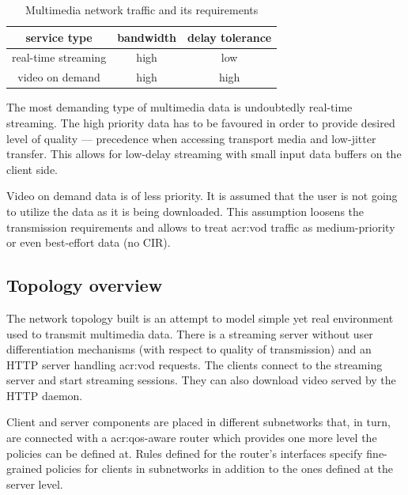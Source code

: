 \documentclass[11pt]{book}
\begin{document}
        \begin{table}[H]
          \begin{center}
            \begin{tabular}{|c|c|c|}
              \hline
              service type        & bandwidth & delay tolerance \\
              \hline \hline
              real-time streaming & high      & low \\
              \hline
              video on demand     & high      & high  \\
              \hline
            \end{tabular}
          \end{center}


          \caption{Multimedia network traffic and its requirements}
          \label{tab:uc:qos}
        \end{table}

        The most demanding type of multimedia data is undoubtedly real-time streaming. The high priority data has to be
        favoured in order to provide desired level of quality --- precedence when accessing transport media and
        low-jitter transfer. This allows for low-delay streaming with small input data buffers on the client side.

        Video on demand data is of less priority. It is assumed that the user is not going to utilize the data as it is
        being downloaded. This assumption loosens the transmission requirements and allows to treat \gls{acr:vod} traffic as
        medium-priority or even best-effort data (no CIR).


      \subsection{Topology overview}

        The network topology built is an attempt to model simple yet real environment used to transmit multimedia data.
        There is a streaming server without user differentiation mechanisms (with respect to quality of transmission)
        and an HTTP server handling \gls{acr:vod} requests. The clients connect to the streaming server and start streaming
        sessions. They can also download video served by the HTTP daemon.

        Client and server components are placed in different subnetworks that, in turn, are connected with a \gls{acr:qos}-aware
        router which provides one more level the policies can be defined at. Rules defined for the router's interfaces
        specify fine-grained policies for clients in subnetworks in addition to the ones defined at the server level.
\end{document}
